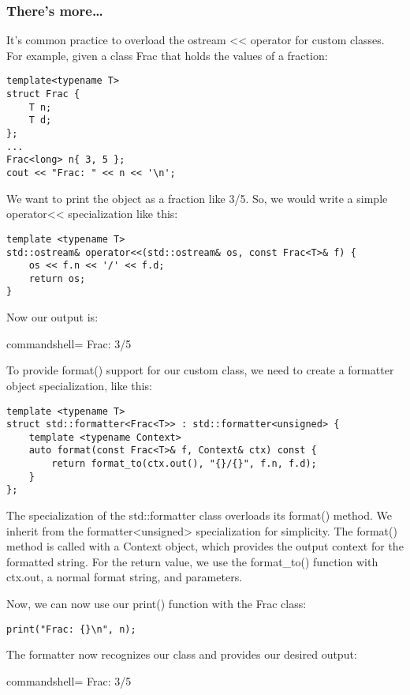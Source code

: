 \subsubsection{There's more…}

It's common practice to overload the ostream <{}< operator for custom classes. For example, given a class Frac that holds the values of a fraction:

\begin{lstlisting}[style=styleCXX]
template<typename T>
struct Frac {
	T n;
	T d;
};
...
Frac<long> n{ 3, 5 };
cout << "Frac: " << n << '\n';
\end{lstlisting}

We want to print the object as a fraction like 3/5. So, we would write a simple operator<{}< specialization like this:

\begin{lstlisting}[style=styleCXX]
template <typename T>
std::ostream& operator<<(std::ostream& os, const Frac<T>& f) {
	os << f.n << '/' << f.d;
	return os;
}
\end{lstlisting}

Now our output is:

\begin{tcblisting}{commandshell={}}
Frac: 3/5
\end{tcblisting}

To provide format() support for our custom class, we need to create a formatter object specialization, like this:

\begin{lstlisting}[style=styleCXX]
template <typename T>
struct std::formatter<Frac<T>> : std::formatter<unsigned> {
	template <typename Context>
	auto format(const Frac<T>& f, Context& ctx) const {
		return format_to(ctx.out(), "{}/{}", f.n, f.d);
	}
};
\end{lstlisting}

The specialization of the std::formatter class overloads its format() method. We inherit from the formatter<unsigned> specialization for simplicity. The format() method is called with a Context object, which provides the output context for the formatted string. For the return value, we use the format\_to() function with ctx.out, a normal format string, and parameters.

Now, we can now use our print() function with the Frac class:

\begin{lstlisting}[style=styleCXX]
print("Frac: {}\n", n);
\end{lstlisting}

The formatter now recognizes our class and provides our desired output:

\begin{tcblisting}{commandshell={}}
Frac: 3/5
\end{tcblisting}






